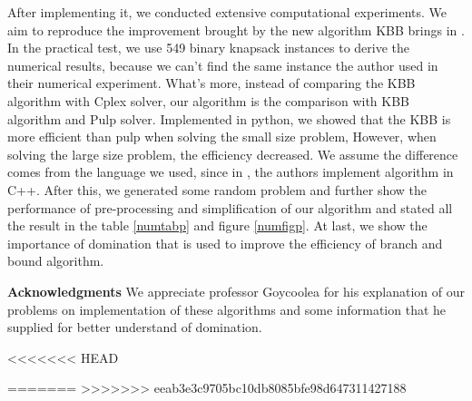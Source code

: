 \documentclass[a4paper,11pt]{article}
\begin{document}
After implementing it, we conducted extensive computational experiments. We aim to reproduce the improvement brought by the new algorithm KBB
brings in \cite{fukasawa2011exact}. In the practical test, we use 549 binary knapsack instances to derive the numerical results, because we can't find the same instance the author used in their numerical experiment. What's more, instead of comparing the KBB algorithm with Cplex solver, our algorithm is the comparison with KBB algorithm and Pulp solver. Implemented in python, we showed that the KBB is more efficient than pulp when solving the small size problem, However, when solving the large size problem, the efficiency decreased. We assume the difference comes from the language we used, since in \cite{fukasawa2011exact}, the authors implement algorithm in C++.  After this, we generated some random problem and further show the performance of pre-processing and simplification of our algorithm and stated all the result in the table \ref{numtabp} and figure \ref{numfigp}. At last, we show the importance of domination that is used to improve the efficiency of branch and bound algorithm.

\textbf{Acknowledgments} We appreciate professor Goycoolea for his explanation of our problems on implementation of these algorithms and some information that he supplied for better understand of domination.  

<<<<<<< HEAD


\newpage
=======
>>>>>>> eeab3e3c9705bc10db8085bfe98d647311427188
 

 
\end{document}
